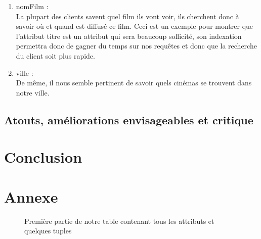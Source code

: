 \documentclass[a4paper,sffamily,12pt]{article}
\begin{document}
					\begin{enumerate}[label=\ding{228}]

						\item nomFilm : \\
						
							La plupart des clients savent quel film ils vont voir, ils cherchent donc à savoir où et quand est diffusé ce film. Ceci est un exemple pour montrer que l'attribut titre est un attribut qui sera beaucoup sollicité, son indexation permettra donc de gagner du temps sur nos requêtes et donc que la recherche du client soit plus rapide.\\
																		
						\item ville : \\
						
							De même, il nous semble pertinent de savoir quels cinémas se trouvent dans notre ville.					
																													
					\end{enumerate}
										
		\subsection{Atouts, améliorations envisageables et critique}
				
			\vspace{0.5cm}
					
			
														
	\section{Conclusion}

			\vspace{0.5cm}




	\section{Annexe}
					
		\begin{figure}[!h]		
			\centering
			\caption{Première partie de notre table contenant tous les attributs et quelques tuples}
			\label{table_p1}	
		\end{figure}			
\end{document}
